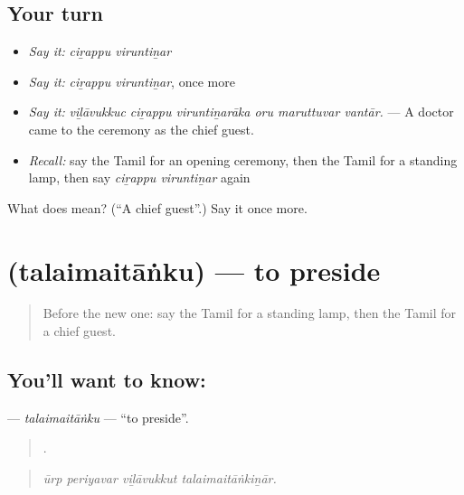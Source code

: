 \subsection*{Your turn}
\begin{itemize}
\raggedright
  \item \emph{Say it:} \emph{ciṟappu viruntiṉar}
  \item \emph{Say it:} \emph{ciṟappu viruntiṉar}, once more
  \item \emph{Say it:} \emph{viḻāvukkuc ciṟappu viruntiṉarāka oru maruttuvar vantār.} — A doctor came to the ceremony as the chief guest.
  \item \emph{Recall:} say the Tamil for an opening ceremony, then the Tamil for a standing lamp, then say \emph{ciṟappu viruntiṉar} again
\end{itemize}

\begin{tcolorbox}[breakable,colback=teal!4,colframe=teal!35!black,title={Before you move on}]
What does   mean? (\textquotedblleft{}A chief guest\textquotedblright{}.) Say it once more.
\end{tcolorbox}
\section[\texorpdfstring{\ta{தலைமைதாங்கு} (talaimaitāṅku)}{தலைமைதாங்கு (talaimaitāṅku)}]{ (talaimaitāṅku) — to preside}

\label{lesson:TA-C318-talaimaitanku}



\begin{quote}
Before the new one: say the Tamil for a standing lamp, then the Tamil for a chief guest.
\end{quote}

\subsection*{You'll want to know: }
\textbf{} — \emph{talaimaitāṅku} — \textquotedblleft{}to preside\textquotedblright{}.

\begin{quote}
   .
\end{quote}

\begin{quote}
\emph{ūrp periyavar viḻāvukkut talaimaitāṅkiṉār.}
\end{quote}

